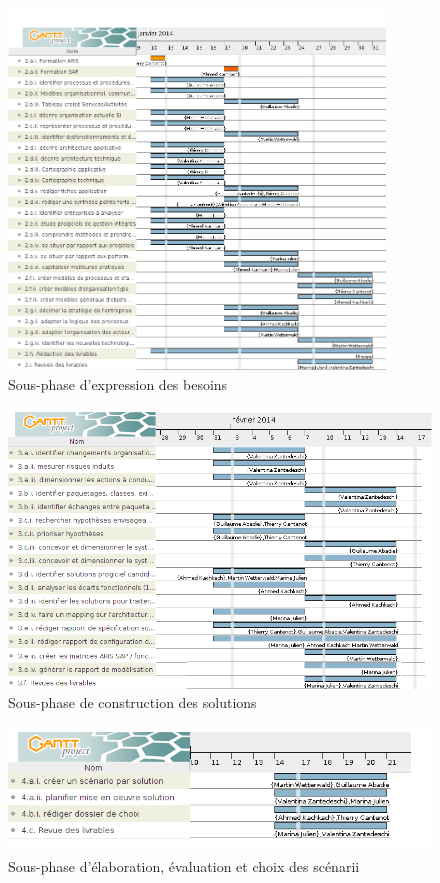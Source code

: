 \begin{figure}[h]
    \centering
    \includegraphics[width=100mm]{./images/SPIE_besoins.png}
    \caption{Sous-phase d'expression des besoins}
    \label{diagram:si_map}
\end{figure}

\begin{figure}[h]
    \centering
    \includegraphics[width=150mm]{./images/SPIE_3.png}
    \caption{Sous-phase de construction des solutions}
    \label{diagram:si_map}
\end{figure}

\begin{figure}[h]
    \centering
    \includegraphics[scale=0.65]{./images/SPIE_4.png}
    \caption{Sous-phase d'élaboration, évaluation et choix des scénarii}
    \label{diagram:si_map}
\end{figure}

